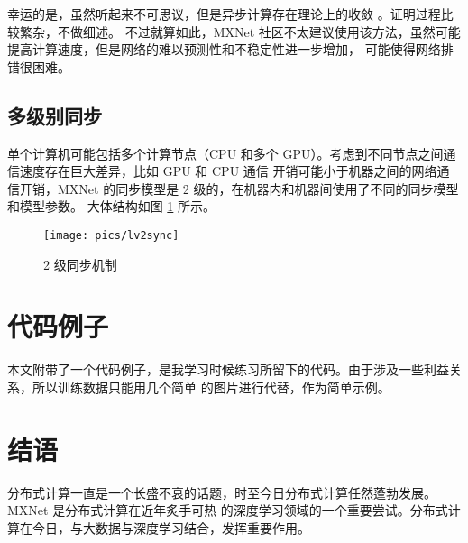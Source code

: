 \documentclass{ctexart}
\begin{document}
幸运的是，虽然听起来不可思议，但是异步计算存在理论上的收敛 \cite{scaling}。证明过程比较繁杂，不做细述。
不过就算如此，MXNet 社区不太建议使用该方法，虽然可能提高计算速度，但是网络的难以预测性和不稳定性进一步增加，
可能使得网络排错很困难。

\subsection{多级别同步}

单个计算机可能包括多个计算节点（CPU 和多个 GPU）。考虑到不同节点之间通信速度存在巨大差异，比如 GPU 和 CPU 通信
开销可能小于机器之间的网络通信开销，MXNet 的同步模型是 2 级的，在机器内和机器间使用了不同的同步模型和模型参数。
大体结构如图 \ref{fig:lv2sync} 所示。

\begin{figure}
\centering
\texttt{[image: pics/lv2sync]}
\caption{2 级同步机制}
\label{fig:lv2sync}
\end{figure}

\section{代码例子}

本文附带了一个代码例子，是我学习时候练习所留下的代码。由于涉及一些利益关系，所以训练数据只能用几个简单
的图片进行代替，作为简单示例。

\section{结语}

分布式计算一直是一个长盛不衰的话题，时至今日分布式计算任然蓬勃发展。MXNet 是分布式计算在近年炙手可热
的深度学习领域的一个重要尝试。分布式计算在今日，与大数据与深度学习结合，发挥重要作用。

\pagebreak

\end{document}
